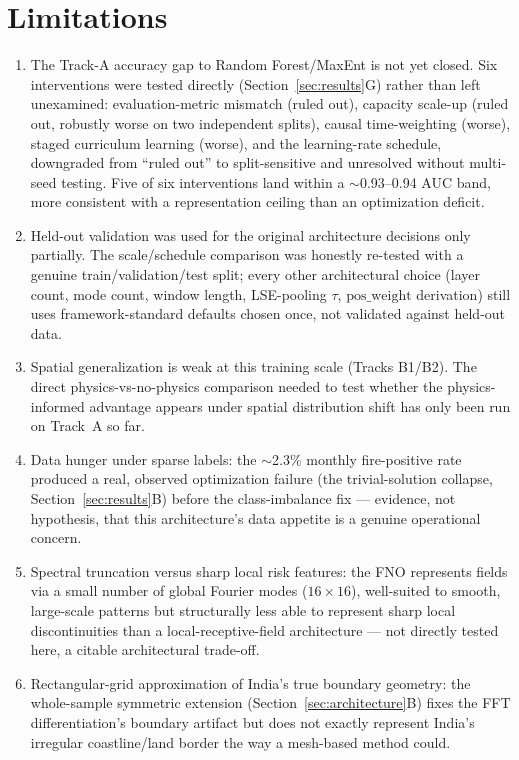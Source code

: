 \documentclass[journal]{IEEEtran}
\begin{document}
\section{Limitations}

\begin{enumerate}
\item The Track-A accuracy gap to Random Forest/MaxEnt is not yet closed. Six interventions were tested directly (Section~\ref{sec:results}G) rather than left unexamined: evaluation-metric mismatch (ruled out), capacity scale-up (ruled out, robustly worse on two independent splits), causal time-weighting (worse), staged curriculum learning (worse), and the learning-rate schedule, downgraded from ``ruled out'' to split-sensitive and unresolved without multi-seed testing. Five of six interventions land within a $\sim$0.93--0.94 AUC band, more consistent with a representation ceiling than an optimization deficit.
\item Held-out validation was used for the original architecture decisions only partially. The scale/schedule comparison was honestly re-tested with a genuine train/validation/test split; every other architectural choice (layer count, mode count, window length, LSE-pooling $\tau$, $\mathrm{pos\_weight}$ derivation) still uses framework-standard defaults chosen once, not validated against held-out data.
\item Spatial generalization is weak at this training scale (Tracks B1/B2). The direct physics-vs-no-physics comparison needed to test whether the physics-informed advantage appears under spatial distribution shift has only been run on Track~A so far.
\item Data hunger under sparse labels: the $\sim$2.3\% monthly fire-positive rate produced a real, observed optimization failure (the trivial-solution collapse, Section~\ref{sec:results}B) before the class-imbalance fix --- evidence, not hypothesis, that this architecture's data appetite is a genuine operational concern.
\item Spectral truncation versus sharp local risk features: the FNO represents fields via a small number of global Fourier modes ($16\times16$), well-suited to smooth, large-scale patterns but structurally less able to represent sharp local discontinuities than a local-receptive-field architecture --- not directly tested here, a citable architectural trade-off.
\item Rectangular-grid approximation of India's true boundary geometry: the whole-sample symmetric extension (Section~\ref{sec:architecture}B) fixes the FFT differentiation's boundary artifact but does not exactly represent India's irregular coastline/land border the way a mesh-based method could.

\end{enumerate}
\end{document}
